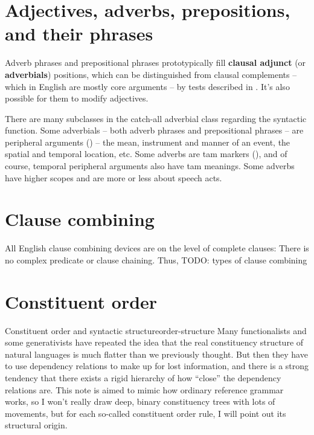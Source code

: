 \documentclass[UTF8, a4paper, oneside, scheme=plain]{ctexrep}
\newcommand*{\citesec}[1]{\S~{#1}}
\newcommand*{\citechap}[1]{Ch~{#1}}
\newcommand*{\citechapsec}[2]{\citechap{#1}.\citesec{#2}}
\newcommand*{\concept}[1]{\textbf{#1}}
\begin{document}
\section{Adjectives, adverbs, prepositions, and their phrases}

Adverb phrases and prepositional phrases 
prototypically fill \concept{clausal adjunct} (or \concept{adverbials}) positions, 
which can be distinguished from clausal complements -- which in English are mostly core arguments
-- by tests described in \citet[\citechapsec{4}{1.2}]{cgel}.
It's also possible for them to modify adjectives.

There are many subclasses in the catch-all adverbial class
regarding the syntactic function.
Some adverbials -- both adverb phrases and prepositional phrases -- 
are peripheral arguments () -- 
the mean, instrument and manner of an event,
the spatial and temporal location, etc. 
Some adverbs are \acs{tam} markers (),
and of course, temporal peripheral arguments also have \acs{tam} meanings.
Some adverbs have higher scopes and are more or less about speech acts.

\section{Clause combining}\label{sec:clause-combining}

All English clause combining devices are on the level of complete clauses:
There is no complex predicate or clause chaining.
Thus, TODO: types of clause combining

\section{Constituent order}\label{sec:overview.constituent-order}

\begin{theorybox}{Constituent order and syntactic structure}{order-structure}
    Many functionalists and some generativists have repeated the idea that 
    the real constituency structure of natural languages 
    is much flatter than we previously thought.
    But then they have to use dependency relations to make up for lost information,
    and there is a strong tendency that 
    there exists a rigid hierarchy of how ``close'' the dependency relations are.
    This note is aimed to mimic how ordinary reference grammar works,
    so I won't really draw deep, binary constituency trees with lots of movements,
    but for each so-called constituent order rule,
    I will point out its structural origin.
\end{theorybox}
\end{document}
